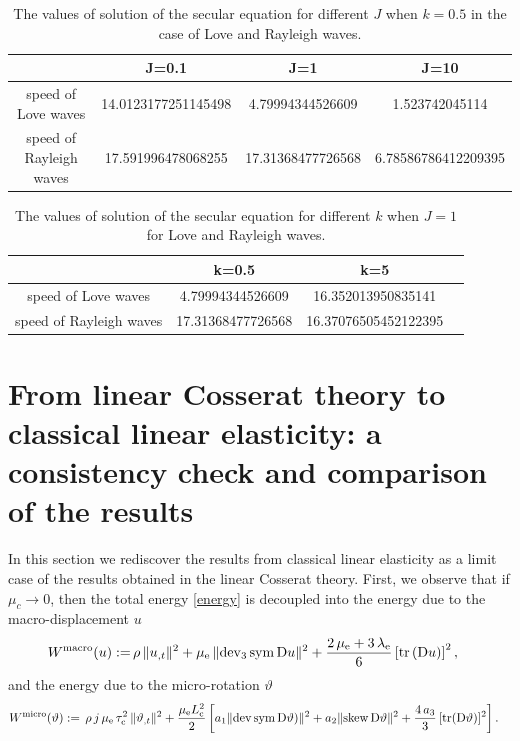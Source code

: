 \documentclass[10pt]{article}
\newcommand{\tr}{{\rm tr}}
\newcommand{\dev}{{\rm dev}}
\newcommand{\sym}{{\rm sym}}
\newcommand{\skw}{{\rm skew}}
\begin{document}
\begin{table}[h!]
	\begin{center}
		\begin{tabular}{|c|c|c|c|}
			\hline
			    & J=0.1               & J=1              & J=10           \\ \hline
			speed of Love waves & 14.0123177251145498 & 4.79994344526609 & 1.523742045114 \\ \hline
		speed of Rayleigh waves & 17.591996478068255 & 17.31368477726568 & 6.78586786412209395 \\ \hline
		\end{tabular}
		\caption{The values of solution of the secular equation for different $J$ when $k=0.5$ in the case of Love and Rayleigh waves.}\label{tab1}
	\end{center}
\end{table}

\begin{table}[h!]
\begin{center}
\begin{tabular}{|c|c|c|c|}
\hline
  & k=0.5            & k=5                \\ \hline
speed of Love waves  & 4.79994344526609 & 16.352013950835141    \\ \hline
	speed of Rayleigh waves & 17.31368477726568 & 16.37076505452122395   \\ \hline
\end{tabular}
\caption{The values of solution of the secular equation for different $k$ when $J=1$ for Love and Rayleigh waves. }
\label{tab2}\end{center}
\end{table}




\section{From linear Cosserat theory to classical linear elasticity: a consistency check and comparison of the results}\label{Classic}\setcounter{equation}{0}

In this section we rediscover the results from classical linear elasticity as a limit case of the results obtained in the linear Cosserat theory. First, we observe that if $\mu_c\to 0$, then 
the total energy \eqref{energy} is decoupled into the energy due to the macro-displacement $u$
 \begin{align}
	W^{\rm macro}(u ):=&\,\rho\,\|u_{,t}\|^2+ \mu_{\rm e} \,\lVert \dev_3\, \sym\,\mathrm{D}u\rVert ^{2}+\frac{2\,\mu_{\rm e} +3\,\lambda_{\rm e} }{6}\left[\mathrm{tr} \left(\mathrm{D}u\right)\right]^{2},
\end{align}
and 
the energy due to the micro-rotation $\vartheta$ 
\begin{align}&
		W^{\rm micro}(\vartheta ):=\,\rho\,j\,\mu_{\rm e}\,\tau_{\rm c}^2\,\|\vartheta_{,t}\|^2+\frac{\mu_{\rm e}L_{\rm c}^2}{2}\left[{a_1 } \|\dev\,\sym \,\mathrm{D} \vartheta)\|^2+{a_2}\|\skw \,\mathrm{D}\vartheta\|^2+ \frac{4\,a_3}{3}\,[\tr(\mathrm{D} \vartheta)]^2\right].
\end{align}
\end{document}
